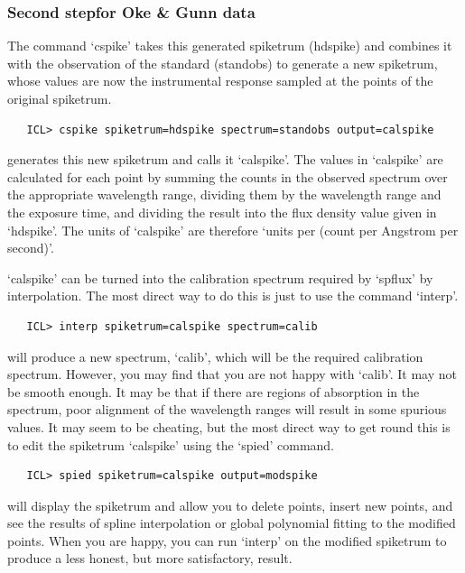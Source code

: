 
\subsubsection{\label{techno5ogsecond}Second step\latorhtm{---}{-}for Oke
   \& Gunn data}

   The command `cspike' takes this generated spiketrum (hdspike) and
   combines it with the observation of the standard (standobs) to
   generate a new spiketrum, whose values are now the instrumental
   response sampled at the points of the original spiketrum.

\begin{verbatim}
   ICL> cspike spiketrum=hdspike spectrum=standobs output=calspike
\end{verbatim}

   generates this new spiketrum and calls it `calspike'.  The values in
   `calspike' are calculated for each point by summing the counts in the
   observed spectrum over the appropriate wavelength range, dividing
   them by the wavelength range and the exposure time, and dividing the
   result into the flux density value given in `hdspike'.  The units of
   `calspike' are therefore `units per (count per Angstrom per second)'.

   `calspike' can be turned into the calibration spectrum required by
   `spflux' by interpolation.  The most direct way to do this is just to
   use the command `interp'.

\begin{verbatim}
   ICL> interp spiketrum=calspike spectrum=calib
\end{verbatim}

   will produce a new spectrum, `calib', which will be the required
   calibration spectrum.  However, you may find that you are not happy
   with `calib'.  It may not be smooth enough.  It may be that if there
   are regions of absorption in the spectrum, poor alignment of the
   wavelength ranges will result in some spurious values.  It may seem
   to be cheating, but the most direct way to get round this is to edit
   the spiketrum `calspike' using the `spied' command.

\begin{verbatim}
   ICL> spied spiketrum=calspike output=modspike
\end{verbatim}

   will display the spiketrum and allow you to delete points, insert new
   points, and see the results of spline interpolation or global
   polynomial fitting to the modified points.  When you are happy, you
   can run `interp' on the modified spiketrum to produce a less honest,
   but more satisfactory, result.


